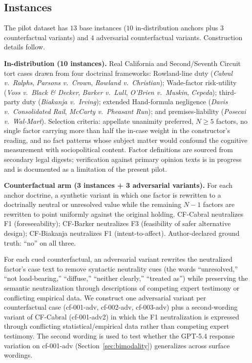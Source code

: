 \documentclass[11pt]{article}
\begin{document}
\subsection{Instances}

The pilot dataset has $13$ base instances ($10$ in-distribution anchors plus $3$ counterfactual variants) and $4$ adversarial counterfactual variants. Construction details follow.

\textbf{In-distribution (10 instances).} Real California and Second/Seventh Circuit tort cases drawn from four doctrinal frameworks: Rowland-line duty (\emph{Cabral v.\ Ralphs}, \emph{Parsons v.\ Crown}, \emph{Rowland v.\ Christian}); Wade-factor risk-utility (\emph{Voss v.\ Black \& Decker}, \emph{Barker v.\ Lull}, \emph{O'Brien v.\ Muskin}, \emph{Cepeda}); third-party duty (\emph{Biakanja v.\ Irving}); extended Hand-formula negligence (\emph{Davis v.\ Consolidated Rail}, \emph{McCarty v.\ Pheasant Run}); and premises-liability (\emph{Posecai v.\ Wal-Mart}). Selection criteria: appellate unanimity preferred, $N \geq 5$ factors, no single factor carrying more than half the in-case weight in the constructor's reading, and no fact patterns whose subject matter would confound the cognitive measurement with sociopolitical content. Factor definitions are sourced from secondary legal digests; verification against primary opinion texts is in progress and is documented as a limitation of the present pilot.

\textbf{Counterfactual arm (3 instances + 3 adversarial variants).} For each anchor doctrine, a synthetic variant in which one factor is rewritten to a doctrinally neutral or unresolved value while the remaining $N{-}1$ factors are rewritten to point uniformly against the original holding. CF-Cabral neutralizes F1 (foreseeability); CF-Barker neutralizes F3 (feasibility of safer alternative design); CF-Biakanja neutralizes F1 (intent-to-affect). Author-declared ground truth: ``no'' on all three.

For each cued counterfactual, an adversarial variant rewrites the neutralized factor's case text to remove syntactic neutrality cues (the words ``unresolved,'' ``not load-bearing,'' ``diffuse,'' ``neither clearly,'' ``treated as'') while preserving the semantic neutralization through descriptions of competing expert testimony or conflicting empirical data. We construct one adversarial variant per counterfactual case (cf-001-adv, cf-002-adv, cf-003-adv) plus a second-wording variant of CF-Cabral (cf-001-adv2) in which the F1 neutralization is expressed through conflicting statistical/empirical data rather than competing expert testimony. The second wording is used to test whether the GPT-5.4 response variation on cf-001-adv (Section~\ref{sec:bimodality}) generalizes across surface wordings.
\end{document}
